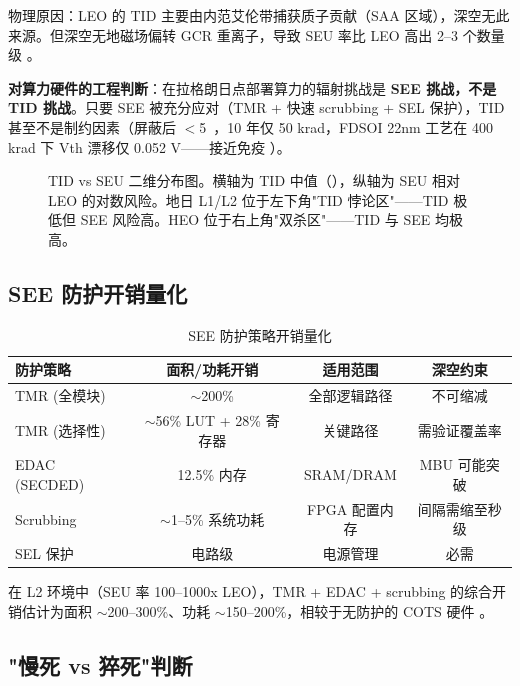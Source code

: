 物理原因：LEO 的 TID 主要由内范艾伦带捕获质子贡献（SAA 区域），深空无此来源。但深空无地磁场偏转 GCR 重离子，导致 SEU 率比 LEO 高出 2--3 个数量级 \cite{jahan_radiation_2026}。

\textbf{对算力硬件的工程判断}：在拉格朗日点部署算力的辐射挑战是 \textbf{SEE 挑战，不是 TID 挑战}。只要 SEE 被充分应对（TMR + 快速 scrubbing + SEL 保护），TID 甚至不是制约因素（屏蔽后 $<$5~\kradyr，10 年仅 50 krad，FDSOI 22nm 工艺在 400 krad 下 Vth 漂移仅 0.052 V——接近免疫 \cite{jahan_radiation_2026}）。

\begin{figure}[H]
\centering

\caption{TID vs SEU 二维分布图。横轴为 TID 中值（\kradyr），纵轴为 SEU 相对 LEO 的对数风险。地日 L1/L2 位于左下角"TID 悖论区"——TID 极低但 SEE 风险高。HEO 位于右上角"双杀区"——TID 与 SEE 均极高。}
\label{fig:tid-vs-seu}
\end{figure}

\subsection{SEE 防护开销量化}

\begin{table}[H]
\centering
\caption{SEE 防护策略开销量化}
\label{tab:see-cost}
\small
\begin{tabular}{@{}lccc@{}}
\toprule
\textbf{防护策略} & \textbf{面积/功耗开销} & \textbf{适用范围} & \textbf{深空约束} \\
\midrule
TMR (全模块)     & $\sim$200\% & 全部逻辑路径 & 不可缩减 \\
TMR (选择性)     & $\sim$56\% LUT + 28\% 寄存器 & 关键路径 & 需验证覆盖率 \\
EDAC (SECDED)    & 12.5\% 内存 & SRAM/DRAM & MBU 可能突破 \\
Scrubbing        & $\sim$1--5\% 系统功耗 & FPGA 配置内存 & 间隔需缩至秒级 \\
SEL 保护        & 电路级 & 电源管理 & 必需 \\
\bottomrule
\end{tabular}
\end{table}

在 L2 环境中（SEU 率 100--1000x LEO），TMR + EDAC + scrubbing 的综合开销估计为面积 $\sim$200--300\%、功耗 $\sim$150--200\%，相较于无防护的 COTS 硬件 \cite{kchaou_tmr_2026}。

\subsection{"慢死 vs 猝死"判断}

